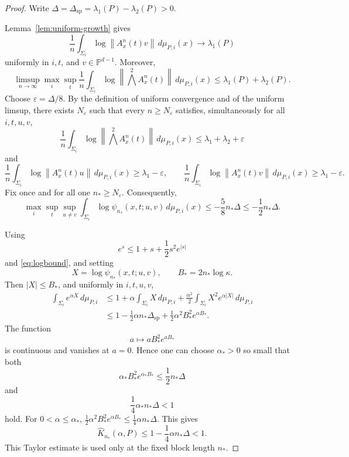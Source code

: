 \documentclass[11pt,a4paper]{amsart}
\newcommand{\PP}{\mathbb P}
\newcommand{\norm}[1]{\left\lVert #1\right\rVert}
\newcommand{\gap}{\Delta_{\mathrm{sp}}}
\begin{document}
\begin{proof}
Write \(\Delta=\gap =\lambda_1(P) - \lambda_2(P)>0\). %

\smallskip

Lemma~\ref{lem:uniform-growth} gives
\[
 \frac1n\int_{\Sigma_i}
 \log\norm{A_x^n(t)v}\,d\mu_{P,i}(x)
 \longrightarrow\lambda_1(P)
\]
uniformly in \(i,t\), and \(v\in\PP^{d-1}\).  Moreover,
\[
 \limsup_{n\to\infty}\max_i\sup_t\frac1n
 \int_{\Sigma_i}
 \log\norm{\textstyle\bigwedge^2 A_x^n(t)}
 \,d\mu_{P,i}(x)
 \le\lambda_1(P)+\lambda_2(P).
\]
Choose \(\varepsilon=\Delta/8\).  By the definition of uniform
convergence and of the uniform limsup, there exists \(N_\varepsilon\)
such that every \(n\ge N_\varepsilon\) satisfies, simultaneously for
all \(i,t,u,v\),
\[
 \frac1n\int_{\Sigma_i}
 \log\norm{{\textstyle\bigwedge^2}A_x^{n}(t)}
 \,d\mu_{P,i}(x)
 \le\lambda_1+\lambda_2+\varepsilon
\]
and
\[
 \frac1n\int_{\Sigma_i}
 \log\norm{A_x^{n}(t)u}\,d\mu_{P,i}(x)
 \ge\lambda_1-\varepsilon,\qquad
 \frac1n\int_{\Sigma_i}
 \log\norm{A_x^{n}(t)v}\,d\mu_{P,i}(x)
 \ge\lambda_1-\varepsilon.
\]
Fix once and for all one \(n_*\ge N_\varepsilon\).
Consequently,
\[
 \max_i\sup_t\sup_{u\ne v}
 \int_{\Sigma_i}\log\psi_{n_*}(x,t;u,v)
 \,d\mu_{P,i}(x)
 \le-\frac58n_*\Delta
 \le-\frac12n_*\Delta.
\]

\smallskip
Using
\[
 e^s\le1+s+\frac12s^2e^{|s|}
\]
and \eqref{eq:logbound}, and setting
\[
 X=\log\psi_{n_*}(x,t;u,v),\qquad
 B_*=2n_*\log\kappa.
\]
Then \(|X|\le B_*\), and uniformly in \(i,t,u,v\),
\[
\begin{aligned}
 \int_{\Sigma_i}e^{\alpha X}\,d\mu_{P,i}
 &\le 1+\alpha\int_{\Sigma_i}X\,d\mu_{P,i}
       +\frac{\alpha^2}{2}
        \int_{\Sigma_i}X^2e^{\alpha|X|}\,d\mu_{P,i}\\
 &\le 1-\frac12\alpha n_*\gap
       +\frac12\alpha^2B_*^2e^{\alpha B_*}.
\end{aligned}
\]
The function
\[
 a\longmapsto aB_*^2e^{aB_*}
\]
is continuous and vanishes at \(a=0\).  Hence one can choose
\(\alpha_*>0\) so small that both
\[
 \alpha_*B_*^2e^{\alpha_*B_*}
 \le\frac12n_*\Delta
\]
and
\[
 \frac14\alpha_*n_*\Delta<1
\]
hold.  For 
\(0<\alpha\le\alpha_*\), 
$\frac12\alpha^2B_*^2e^{\alpha B_*} \le\frac14\alpha n_*\Delta$.
This gives
\[
 \widehat K_{n_*}(\alpha,P)
 \le
 1-\frac14\alpha n_*\Delta<1.
\]
This Taylor estimate is used only at the fixed block length \(n_*\).


\end{proof}
\end{document}

